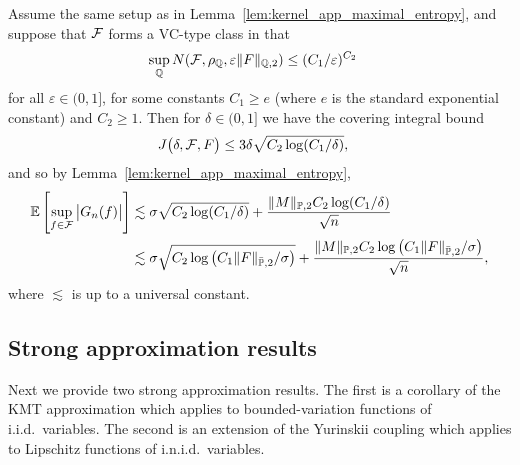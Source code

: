 \begin{lemma}
  \label{lem:kernel_app_maximal_vc_inid}

  Assume the same setup as in
  Lemma~\ref{lem:kernel_app_maximal_entropy},
  and suppose that $\mathcal{F}$ forms a VC-type class
  in that
  \begin{align*}
    \sup_{\mathbb{Q}} N(\mathcal{F}, \rho_{\mathbb{Q}}, \varepsilon \|F\|_{\mathbb{Q},2})
    &\leq
    (C_1/\varepsilon)^{C_2}
  \end{align*}
  for all $\varepsilon \in (0,1]$,
  for some constants
  $C_1 \geq e$
  (where $e$ is the standard exponential constant)
  and $C_2 \geq 1$.
  Then for $\delta \in (0,1]$
  we have the covering integral bound
  \begin{align*}
    J\big(\delta, \mathcal{F}, F\big)
    &\leq
    3 \delta
    \sqrt{C_2 \log (C_1/\delta)},
  \end{align*}
  and so by Lemma~\ref{lem:kernel_app_maximal_entropy},
  \begin{align*}
    \mathbb{E} \left[
      \sup_{f \in \mathcal{F}}
      \big| G_n(f) \big|
    \right]
    &\lesssim
    \sigma
    \sqrt{C_2 \log (C_1/\delta)}
    +
    \frac{\|M\|_{\mathbb{P},2} C_2 \log(C_1/\delta)}{\sqrt{n}} \\
    &\lesssim
    \sigma
    \sqrt{C_2 \log \big(C_1 \|F\|_{\bar{\mathbb{P}},2}/\sigma\big)}
    +
    \frac{\|M\|_{\mathbb{P},2} C_2 \log \big(C_1 \|F\|_{\bar{\mathbb{P}},2}/\sigma\big)}
    {\sqrt{n}},
  \end{align*}
  where $\lesssim$ is up to a universal constant.

\end{lemma}

\subsection{Strong approximation results}

Next we provide two strong approximation results.
The first is a corollary of the KMT approximation
\citep{komlos1975approximation}
which applies to bounded-variation functions
of i.i.d.\ variables.
The second is an extension of the Yurinskii coupling
\citep{belloni2019conditional}
which applies to Lipschitz functions
of i.n.i.d.\ variables.

